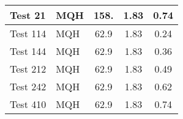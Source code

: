 \begin{table}[!ht]
\begin{center}
\begin{tabular}{|l|l|c|c|c|}
Test 21    &  MQH               &  158.           &  1.83        &  0.74        \\ \hline
Test 114   &  MQH               &  62.9           &  1.83        &  0.24        \\ \hline
Test 144   &  MQH               &  62.9           &  1.83        &  0.36        \\ \hline
Test 212   &  MQH               &  62.9           &  1.83        &  0.49        \\ \hline
Test 242   &  MQH               &  62.9           &  1.83        &  0.62        \\ \hline
Test 410   &  MQH               &  62.9           &  1.83        &  0.74        \\ \hline
\end{tabular}
\end{center}
\end{table}

